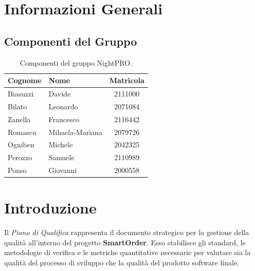 \documentclass[a4paper,11pt,oneside]{scrartcl}
\begin{document}
\newpage
\tableofcontents
\newpage

\section*{Informazioni Generali}

\subsection*{Componenti del Gruppo}

\begin{table}[h!]
\centering
\renewcommand{\arraystretch}{1.2}
\begin{tabular}{@{}llc@{}}
\toprule
\textbf{Cognome} & \textbf{Nome} & \textbf{Matricola} \\
\midrule
Biasuzzi & Davide & 2111000 \\
Bilato & Leonardo & 2071084 \\
Zanella & Francesco & 2116442 \\
Romascu & Mihaela-Mariana & 2079726 \\
Ogniben & Michele & 2042325 \\
Perozzo & Samuele & 2110989 \\
Ponso & Giovanni & 2000558 \\
\bottomrule
\end{tabular}
\caption{Componenti del gruppo NightPRO.}
\end{table}

\newpage
\section{Introduzione}

Il \textit{Piano di Qualifica} rappresenta il documento strategico per la gestione della qualità all'interno del progetto \textbf{SmartOrder}. Esso stabilisce gli standard, le metodologie di verifica e le metriche quantitative necessarie per valutare sia la qualità del processo di sviluppo che la qualità del prodotto software finale.
\end{document}
